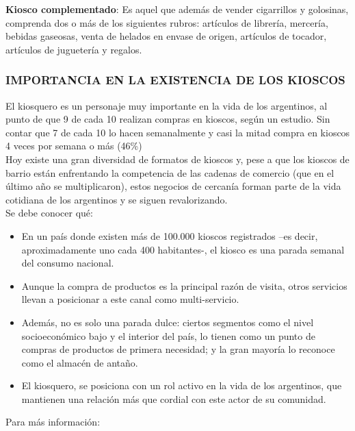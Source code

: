 \documentclass[twoside]{article}
\begin{document}
\textbf{Kiosco complementado}: Es aquel que además de vender cigarrillos y golosinas, comprenda
dos o más de los siguientes rubros: artículos de librería, mercería, bebidas gaseosas, venta de helados
en envase de origen, artículos de tocador, artículos de juguetería y regalos. \cite{voicesconsultancyKioscoArgentino} \par 

\subsubsection{IMPORTANCIA EN LA EXISTENCIA DE LOS KIOSCOS}
El kiosquero es un personaje muy importante en la vida de los argentinos, al punto de que 9 de cada 10 realizan compras en kioscos, según un estudio. Sin contar que 7 de cada 10 lo hacen semanalmente y casi la mitad compra en kioscos 4 veces por semana o más (46\%) \\

Hoy existe una gran diversidad de formatos de kioscos y, pese a que los kioscos de barrio están enfrentando la competencia de las cadenas de comercio (que en el último año se multiplicaron), estos negocios de cercanía forman parte de la vida cotidiana de los argentinos y se siguen revalorizando. \\

Se debe conocer qué:
\begin{itemize}
    \item En un país donde existen más de 100.000 kioscos registrados –es decir, aproximadamente uno cada 400 habitantes-, el kiosco es una parada semanal del consumo nacional.
    \item Aunque la compra de productos es la principal razón de visita, otros servicios llevan a posicionar a este canal como multi-servicio.
    \item Además, no es solo una parada dulce: ciertos segmentos como el nivel socioeconómico bajo y el interior del país, lo tienen como un punto de compras de productos de primera necesidad; y la gran mayoría lo reconoce como el almacén de antaño.
    \item El kiosquero, se posiciona con un rol activo en la vida de los argentinos, que mantienen una relación más que cordial con este actor de su comunidad.
\end{itemize}

Para más información: \cite{ambitoTodoSobre}
\end{document}
